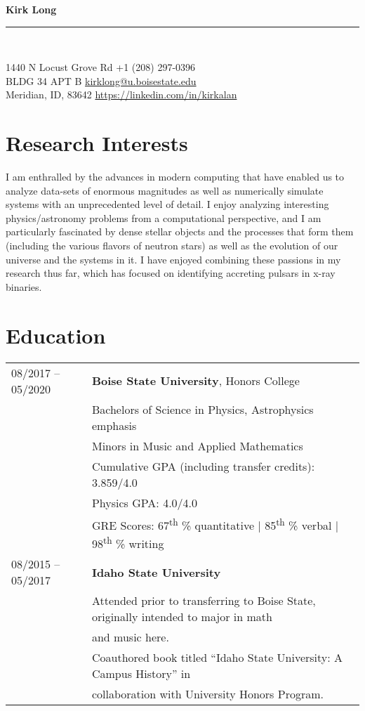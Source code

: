 \documentclass[11pt]{article}
\newcommand{\makeheading}[2]%
        {\begin{minipage}[t]{\textwidth}%
                 {\LARGE \bfseries #1} \\[-0.3\baselineskip]%
                 \rule{\columnwidth}{1.5pt}\\[0.1\baselineskip]
         \end{minipage}}
\begin{document}
\makeheading{Kirk Long}{}

1440 N Locust Grove Rd				\hfill	+1 (208) 297-0396\\
BLDG 34 APT B	\hfill	\href{mailto:kirklong@u.boisestate.edu}{kirklong@u.boisestate.edu}\\
Meridian, ID, 83642			\hfill	\url{https://linkedin.com/in/kirkalan}



\section{Research Interests}
 I am enthralled by the advances in modern computing that have enabled us to analyze data-sets of enormous magnitudes as well as numerically simulate systems with an unprecedented level of detail. I enjoy analyzing interesting physics/astronomy problems from a computational perspective, and I am particularly fascinated by dense stellar objects and the processes that form them (including the various flavors of neutron stars) as well as the evolution of our universe and the systems in it. I have enjoyed combining these passions in my research thus far, which has focused on identifying accreting pulsars in x-ray binaries.

\section{Education}
\begin{tabular}{ll}
08/2017 -- 05/2020	& 	\textbf{Boise State University}, Honors College \\
			&	Bachelors of Science in Physics, Astrophysics emphasis\\
			&	Minors in Music and Applied Mathematics\vspace{1mm} \\
			&	Cumulative GPA (including transfer credits): 3.859/4.0\\
      & Physics GPA: 4.0/4.0\\
      & GRE Scores: 67\textsuperscript{th} \% quantitative | 85\textsuperscript{th} \% verbal | 98\textsuperscript{th} \% writing \vspace{2mm} \\
08/2015 -- 05/2017 & \textbf{Idaho State University} \\
      & Attended prior to transferring to Boise State, originally intended to major in math\\
      & and music here.\\
      & Coauthored book titled ``Idaho State University: A Campus History'' in \\
      & collaboration with University Honors Program.\\

\end{tabular}
\end{document}
